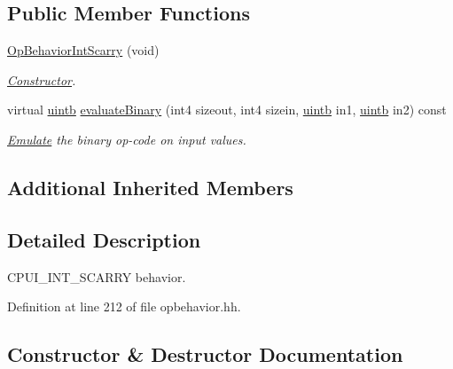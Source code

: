 \subsection*{Public Member Functions}
\begin{DoxyCompactItemize}
\item 
\mbox{\hyperlink{class_op_behavior_int_scarry_a3b8be4cdb5e788733cb780095ef4ee43}{Op\+Behavior\+Int\+Scarry}} (void)
\begin{DoxyCompactList}\small\item\em \mbox{\hyperlink{class_constructor}{Constructor}}. \end{DoxyCompactList}\item 
virtual \mbox{\hyperlink{types_8h_a2db313c5d32a12b01d26ac9b3bca178f}{uintb}} \mbox{\hyperlink{class_op_behavior_int_scarry_a293d6ddd7d38c03b3233fafd11ebef48}{evaluate\+Binary}} (int4 sizeout, int4 sizein, \mbox{\hyperlink{types_8h_a2db313c5d32a12b01d26ac9b3bca178f}{uintb}} in1, \mbox{\hyperlink{types_8h_a2db313c5d32a12b01d26ac9b3bca178f}{uintb}} in2) const
\begin{DoxyCompactList}\small\item\em \mbox{\hyperlink{class_emulate}{Emulate}} the binary op-\/code on input values. \end{DoxyCompactList}\end{DoxyCompactItemize}
\subsection*{Additional Inherited Members}


\subsection{Detailed Description}
C\+P\+U\+I\+\_\+\+I\+N\+T\+\_\+\+S\+C\+A\+R\+RY behavior. 

Definition at line 212 of file opbehavior.\+hh.



\subsection{Constructor \& Destructor Documentation}
\mbox{\label{class_op_behavior_int_scarry_a3b8be4cdb5e788733cb780095ef4ee43}} 
